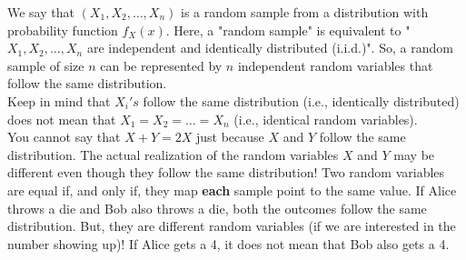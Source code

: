 We say that $(X_1, X_2, \dots, X_n)$ is a random sample from a distribution with probability function $f_X(x)$. Here, a "random sample" is equivalent to  "$X_1, X_2, \dots, X_n$ are independent and identically distributed (i.i.d.)". So, a random sample of size $n$ can be represented by $n$ independent random variables that follow the same distribution. \\
Keep in mind that $X_{i}'s$ follow the same distribution (i.e., identically distributed) does not mean that $X_1 = X_2 = \dots = X_n$ (i.e., identical random variables). \\ You cannot say that $X + Y = 2X$ just because $X$ and $Y$ follow the same distribution. The actual realization of the random variables $X$ and $Y$ may be different even though they follow the same distribution!
Two random variables are equal if, and only if, they map \textbf{each} sample point to the same value. If Alice throws a die and Bob also throws a die, both the outcomes follow the same distribution. But, they are different random variables (if we are interested in the number showing up)! If Alice gets a 4, it does not mean that Bob also gets a 4.
\begin{note}
\end{note}
